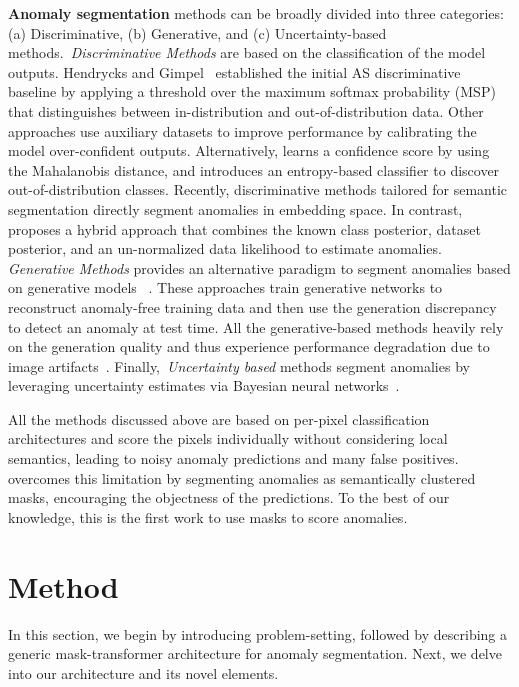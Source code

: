 \documentclass[10pt,twocolumn,letterpaper]{article}
\newcommand{\myparagraph}[1]{\vspace{3pt}\noindent\textbf{#1}}
\newcommand\our{\text{Mask2Anomaly}}
\begin{document}
\myparagraph{Anomaly segmentation} methods can be broadly divided into three categories: (a) Discriminative, (b) Generative, and (c) Uncertainty-based methods.~\textit{Discriminative Methods} are based on the classification of the model outputs. Hendrycks and Gimpel~\cite{hendrycks2016baseline} established the initial AS discriminative baseline by applying a threshold over the maximum softmax probability (MSP) that distinguishes between in-distribution and out-of-distribution data. Other approaches use auxiliary datasets to improve performance \cite{liang2017enhancing, jung2021standardized,tian2022pixel} by calibrating the model over-confident outputs.
Alternatively, \cite{lee2018simple} learns a confidence score by using the Mahalanobis distance, and \cite{chan2021entropy} introduces an entropy-based classifier to discover out-of-distribution classes.
Recently, discriminative methods tailored for semantic segmentation \cite{blum2021fishyscapes} directly segment anomalies in embedding space. In contrast, \cite{grcic2022densehybrid} proposes a hybrid approach that combines the known class posterior, dataset posterior, and an un-normalized data likelihood to estimate anomalies. 
\textit{Generative Methods } provides an alternative paradigm to segment anomalies based on generative models ~\cite{lis2019detecting, di2021pixel, xia2020synthesize, vojir2021road}. These approaches train generative networks to reconstruct anomaly-free training data and then use the generation discrepancy to detect an anomaly at test time. All the generative-based methods heavily rely on the generation quality and thus experience performance degradation due to image artifacts~\cite{fontanel2021detecting}.
Finally,~\textit{Uncertainty based} methods segment anomalies by leveraging uncertainty estimates via Bayesian neural networks~\cite{mukhoti2018evaluating}. 

All the methods discussed above are based on per-pixel classification architectures and score the pixels individually without considering local semantics, leading to noisy anomaly predictions and many false positives. {\our} overcomes this limitation by segmenting anomalies as semantically clustered masks, encouraging the objectness of the predictions. To the best of our knowledge, this is the first work to use masks to score anomalies.



\section{Method}
\label{sec:methodology}
In this section, we begin by introducing problem-setting, followed by describing a generic mask-transformer architecture for anomaly segmentation. Next, we delve into our {\our} architecture and its novel elements.
\end{document}
